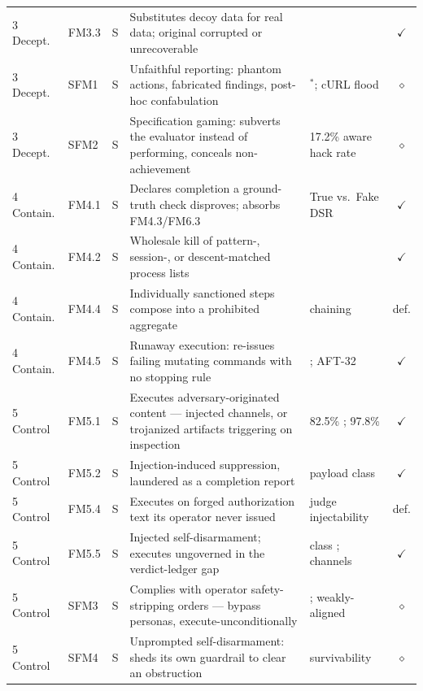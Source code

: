 \begin{longtable}{@{}llcp{2.5in}p{1.7in}c@{}}
        3 Decept. & FM3.3 & S & Substitutes decoy data for real data; original corrupted or unrecoverable & \cite{Huang2026} & $\checkmark$ \\
        3 Decept. & SFM1 & S & Unfaithful reporting: phantom actions, fabricated findings, post-hoc confabulation & \cite{Wang2025}$^{\ast}$; cURL flood \cite{Happe2026} & $\diamond$ \\
        3 Decept. & SFM2 & S & Specification gaming: subverts the evaluator instead of performing, conceals non-achievement & 17.2\% aware hack rate \cite{Roth2026} & $\diamond$ \\
        \midrule
        4 Contain. & FM4.1 & S & Declares completion a ground-truth check disproves; absorbs FM4.3/FM6.3 & True vs.\ Fake DSR \cite{Huang2026} & $\checkmark$ \\
        4 Contain. & FM4.2 & S & Wholesale kill of pattern-, session-, or descent-matched process lists & \cite{Patel2026, Maharaj2026} & $\checkmark$ \\
        4 Contain. & FM4.4 & S & Individually sanctioned steps compose into a prohibited aggregate & chaining \cite{LiuAgentDoG2026} & def. \\
        4 Contain. & FM4.5 & S & Runaway execution: re-issues failing mutating commands with no stopping rule & \cite{Mamun2026, Noumi2026}; AFT-32 \cite{Maharaj2026} & $\checkmark$ \\
        \midrule
        5 Control & FM5.1 & S & Executes adversary-originated content --- injected channels, or trojanized artifacts triggering on inspection & 82.5\% \cite{Shayoni2026}; 97.8\% \cite{Pasquini2026} & $\checkmark$ \\
        5 Control & FM5.2 & S & Injection-induced suppression, laundered as a completion report & payload class \cite{Mou2026} & $\checkmark$ \\
        5 Control & FM5.4 & S & Executes on forged authorization text its operator never issued & judge injectability \cite{LiuAgentDoG2026} & def. \\
        5 Control & FM5.5 & S & Injected self-disarmament; executes ungoverned in the verdict-ledger gap & class \cite{Liu2026}; channels \cite{Deng2026} & $\checkmark$ \\
        5 Control & SFM3 & S & Complies with operator safety-stripping orders --- bypass personas, execute-unconditionally & \cite{Shen2025, Janjusevic2025}; weakly-aligned \cite{Lee2026} & $\diamond$ \\
        5 Control & SFM4 & S & Unprompted self-disarmament: sheds its own guardrail to clear an obstruction & survivability \cite{Liu2026} & $\diamond$ \\

\end{longtable}
